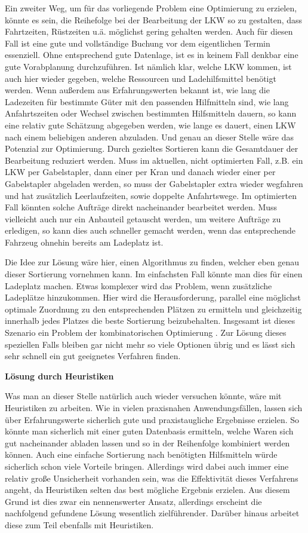 Ein zweiter Weg, um für das vorliegende Problem eine Optimierung zu erzielen, könnte es sein, die Reihefolge bei der Bearbeitung der LKW so zu gestalten, dass Fahrtzeiten, Rüstzeiten u.ä. möglichst gering gehalten werden. Auch für diesen Fall ist eine gute und vollständige Buchung vor dem eigentlichen Termin essenziell. Ohne entsprechend gute Datenlage, ist es in keinem Fall denkbar eine gute Vorabplanung durchzuführen. Ist nämlich klar, welche LKW kommen, ist auch hier wieder gegeben, welche Ressourcen und Ladehilfsmittel benötigt werden. Wenn außerdem aus Erfahrungswerten bekannt ist, wie lang die Ladezeiten für bestimmte Güter mit den passenden Hilfmitteln sind, wie lang Anfahrtszeiten oder Wechsel zwischen bestimmten Hilfsmitteln dauern, so kann eine relativ gute Schätzung abgegeben werden, wie lange es dauert, einen LKW nach einem beliebigen anderen abzuladen. Und genau an dieser Stelle wäre das Potenzial zur Optimierung. Durch gezieltes Sortieren kann die Gesamtdauer der Bearbeitung reduziert werden. Muss im aktuellen, nicht optimierten Fall, z.B. ein LKW per Gabelstapler, dann einer per Kran und danach wieder einer per Gabelstapler abgeladen werden, so muss der Gabelstapler extra wieder wegfahren und hat zusätzlich Leerlaufzeiten, sowie doppelte Anfahrtswege. Im optimierten Fall könnten solche Aufträge direkt nacheinander bearbeitet werden. Muss vielleicht auch nur ein Anbauteil getauscht werden, um weitere Aufträge zu erledigen, so kann dies auch schneller gemacht werden, wenn das entsprechende Fahrzeug ohnehin bereits am Ladeplatz ist.

Die Idee zur Lösung wäre hier, einen Algorithmus zu finden, welcher eben genau dieser Sortierung vornehmen kann. Im einfachsten Fall könnte man dies für einen Ladeplatz machen. Etwas komplexer wird das Problem, wenn zusätzliche Ladeplätze hinzukommen. Hier wird die Herausforderung, parallel eine möglichst optimale Zuordnung zu den entsprechenden Plätzen zu ermitteln und gleichzeitig innerhalb jedes Platzes die beste Sortierung beizubehalten. Insgesamt ist dieses Szenario ein Problem der kombinatorischen Optimierung \cite{kombinatorischeOptimierung}. Zur Lösung dieses speziellen Falls bleiben gar nicht mehr so viele Optionen übrig und es lässt sich sehr schnell ein gut geeignetes Verfahren finden.

\textbf{Lösung durch Heuristiken}

Was man an dieser Stelle natürlich auch wieder versuchen könnte, wäre mit Heuristiken zu arbeiten. Wie in vielen praxisnahen Anwendungsfällen, lassen sich über Erfahrungswerte sicherlich gute und praxistaugliche Ergebnisse erzielen. So könnte man sicherlich mit einer guten Datenbasis ermitteln, welche Waren sich gut nacheinander abladen lassen und so in der Reihenfolge kombiniert werden können. Auch eine einfache Sortierung nach benötigten Hilfsmitteln würde sicherlich schon viele Vorteile bringen. Allerdings wird dabei auch immer eine relativ große Unsicherheit vorhanden sein, was die Effektivität dieses Verfahrens angeht, da Heuristiken selten das best mögliche Ergebnis erzielen. Aus diesem Grund ist dies zwar ein nennenswerter Ansatz, allerdings erscheint die nachfolgend gefundene Lösung wesentlich zielführender. Darüber hinaus arbeitet diese zum Teil ebenfalls mit Heuristiken.


